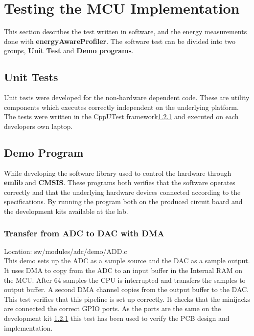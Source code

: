 \section{Testing the MCU Implementation}

This section describes the test written in software, and the energy measurements
done with {\bf energyAwareProfiler}. The software test can be divided into two
groups, {\bf Unit Test} and {\bf Demo programs}.

\subsection{Unit Tests}

Unit tests were developed for the non-hardware dependent code. These are utility components
which executes correctly independent on the underlying platform. The tests were written in
the CppUTest framework\ref{} and executed on each developers own laptop.

\subsection{Demo Program}

While developing the software library used to control the hardware through {\bf emlib} and
{\bf CMSIS}. These programs both verifies that the software operates correctly and that
the underlying hardware devices connected according to the specifications. By running the
program both on the produced circuit board and the development kits available at the lab.

\subsubsection{Transfer from ADC to DAC with DMA}
Location: sw/modules/adc/demo/ADD.c \\
This demo sets up the ADC as a sample source and the DAC as a sample output. It uses DMA
to copy from the ADC to an input buffer in the Internal RAM on the MCU. After 64 samples
the CPU is interrupted and transfers the samples to output buffer. A second DMA channel
copies from the output buffer to the DAC. This test verifies that this pipeline is set
up correctly. It checks that the minijacks are connected the correct GPIO ports. As
the ports are the same on the development kit \ref{} this test has been used to verify
the PCB design and implementation.

